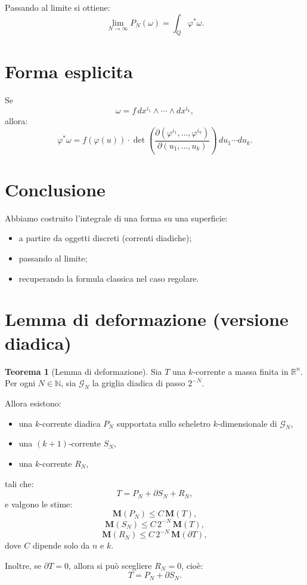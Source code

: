 \documentclass[a4paper,11pt]{article}
\theoremstyle{definition}
\newtheorem{theorem}{Teorema}
\begin{document}
Passando al limite si ottiene:
\[
\lim_{N\to\infty} P_N(\omega) = \int_Q \varphi^*\omega.
\]

\section{Forma esplicita}

Se
\[
\omega = f\, dx^{i_1} \wedge \cdots \wedge dx^{i_k},
\]
allora:
\[
\varphi^*\omega =
f(\varphi(u)) \cdot
\det\left( \frac{\partial(\varphi^{i_1}, \dots, \varphi^{i_k})}{\partial(u_1, \dots, u_k)} \right)
\, du_1 \cdots du_k.
\]

\section{Conclusione}

Abbiamo costruito l'integrale di una forma su una superficie:
\begin{itemize}
\item a partire da oggetti discreti (correnti diadiche);
\item passando al limite;
\item recuperando la formula classica nel caso regolare.
\end{itemize}

\section{Lemma di deformazione (versione diadica)}

\begin{theorem}[Lemma di deformazione]
Sia $T$ una $k$-corrente a massa finita in $\mathbb{R}^n$.
Per ogni $N \in \mathbb{N}$, sia $\mathcal{G}_N$ la griglia diadica di passo $2^{-N}$.

Allora esistono:
\begin{itemize}
\item una $k$-corrente diadica $P_N$ supportata sullo scheletro $k$-dimensionale di $\mathcal{G}_N$,
\item una $(k+1)$-corrente $S_N$,
\item una $k$-corrente $R_N$,
\end{itemize}
tali che:
\[
T = P_N + \partial S_N + R_N,
\]
e valgono le stime:
\[
\mathbf{M}(P_N) \le C\,\mathbf{M}(T),
\]
\[
\mathbf{M}(S_N) \le C\,2^{-N}\,\mathbf{M}(T),
\]
\[
\mathbf{M}(R_N) \le C\,2^{-N}\,\mathbf{M}(\partial T),
\]
dove $C$ dipende solo da $n$ e $k$.

Inoltre, se $\partial T = 0$, allora si può scegliere $R_N = 0$, cioè:
\[
T = P_N + \partial S_N.
\]
\end{theorem}
\end{document}
